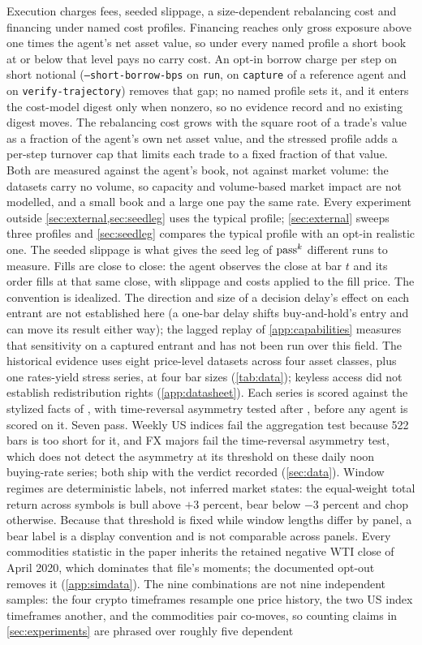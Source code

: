 Execution charges fees, seeded slippage, a size-dependent rebalancing cost and financing under named cost profiles. Financing reaches only gross exposure above one times the agent's net asset value, so under every named profile a short book at or below that level pays no carry cost. An opt-in borrow charge per step on short notional (\texttt{--short-borrow-bps} on \texttt{run}, on \texttt{capture} of a reference agent and on \texttt{verify-trajectory}) removes that gap; no named profile sets it, and it enters the cost-model digest only when nonzero, so no evidence record and no existing digest moves. The rebalancing cost grows with the square root of a trade's value as a fraction of the agent's own net asset value, and the stressed profile adds a per-step turnover cap that limits each trade to a fixed fraction of that value. Both are measured against the agent's book, not against market volume: the datasets carry no volume, so capacity and volume-based market impact are not modelled, and a small book and a large one pay the same rate. Every experiment outside \cref{sec:external,sec:seedleg} uses the typical profile; \cref{sec:external} sweeps three profiles and \cref{sec:seedleg} compares the typical profile with an opt-in realistic one. The seeded slippage is what gives the seed leg of $\text{pass}^{k}$ different runs to measure. Fills are close to close: the agent observes the close at bar $t$ and its order fills at that same close, with slippage and costs applied to the fill price. The convention is idealized. The direction and size of a decision delay's effect on each entrant are not established here (a one-bar delay shifts buy-and-hold's entry and can move its result either way); the lagged replay of \cref{app:capabilities} measures that sensitivity on a captured entrant and has not been run over this field. The historical evidence uses eight price-level datasets across four asset classes, plus one rates-yield stress series, at four bar sizes (\cref{tab:data}); keyless access did not establish redistribution rights (\cref{app:datasheet}). Each series is scored against the stylized facts of \citet{cont2001empirical}, with time-reversal asymmetry tested after \citet{zumbach2009time}, before any agent is scored on it. Seven pass. Weekly US indices fail the aggregation test because 522 bars is too short for it, and FX majors fail the time-reversal asymmetry test, which does not detect the asymmetry at its threshold on these daily noon buying-rate series; both ship with the verdict recorded (\cref{sec:data}). Window regimes are deterministic labels, not inferred market states: the equal-weight total return across symbols is bull above $+3$ percent, bear below $-3$ percent and chop otherwise. Because that threshold is fixed while window lengths differ by panel, a bear label is a display convention and is not comparable across panels. Every commodities statistic in the paper inherits the retained negative WTI close of April 2020, which dominates that file's moments; the documented opt-out removes it (\cref{app:simdata}). The nine combinations are not nine independent samples: the four crypto timeframes resample one price history, the two US index timeframes another, and the commodities pair co-moves, so counting claims in \cref{sec:experiments} are phrased over roughly five dependent 